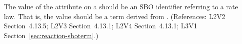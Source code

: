 The value of the  attribute on a \KineticLaw should be an SBO
identifier referring to a rate law.  That is, the value should be a term
derived from \sboratelaw.  (References: L2V2 Section~4.13.5; L2V3
Section~4.13.1; L2V4 Section~4.13.1; L3V1 Section~\ref{sec:reaction-sboterm}.)
